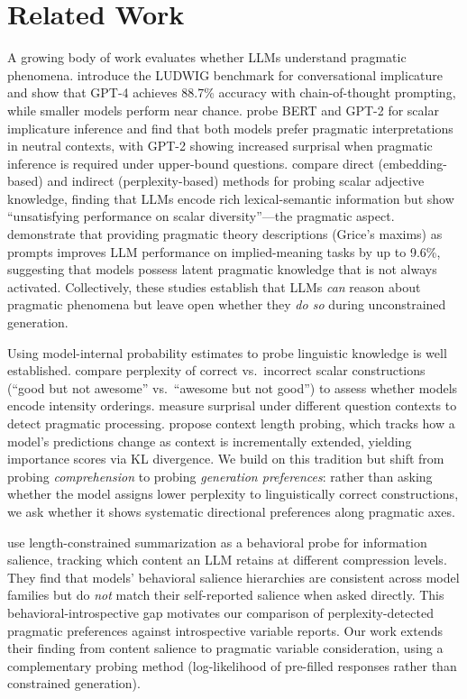 \section{Related Work}
\label{sec:related}

A growing body of work evaluates whether LLMs understand pragmatic phenomena. \citet{ruis2024goldilocks} introduce the LUDWIG benchmark for conversational implicature and show that GPT-4 achieves 88.7\% accuracy with chain-of-thought prompting, while smaller models perform near chance. \citet{cho2024pragmatic} probe BERT and GPT-2 for scalar implicature inference and find that both models prefer pragmatic interpretations in neutral contexts, with GPT-2 showing increased surprisal when pragmatic inference is required under upper-bound questions. \citet{lin2024probing} compare direct (embedding-based) and indirect (perplexity-based) methods for probing scalar adjective knowledge, finding that LLMs encode rich lexical-semantic information but show ``unsatisfying performance on scalar diversity''---the pragmatic aspect. \citet{sato2025pragmatic} demonstrate that providing pragmatic theory descriptions (\eg Grice's maxims) as prompts improves LLM performance on implied-meaning tasks by up to 9.6\%, suggesting that models possess latent pragmatic knowledge that is not always activated. Collectively, these studies establish that LLMs \emph{can} reason about pragmatic phenomena but leave open whether they \emph{do so} during unconstrained generation.

Using model-internal probability estimates to probe linguistic knowledge is well established. \citet{lin2024probing} compare perplexity of correct vs.\ incorrect scalar constructions (\eg ``good but not awesome'' vs.\ ``awesome but not good'') to assess whether models encode intensity orderings. \citet{cho2024pragmatic} measure surprisal under different question contexts to detect pragmatic processing. \citet{cifka2023blackbox} propose context length probing, which tracks how a model's predictions change as context is incrementally extended, yielding importance scores via KL divergence. We build on this tradition but shift from probing \emph{comprehension} to probing \emph{generation preferences}: rather than asking whether the model assigns lower perplexity to linguistically correct constructions, we ask whether it shows systematic directional preferences along pragmatic axes.

\citet{trienes2025behavioral} use length-constrained summarization as a behavioral probe for information salience, tracking which content an LLM retains at different compression levels. They find that models' behavioral salience hierarchies are consistent across model families but do \emph{not} match their self-reported salience when asked directly. This behavioral-introspective gap motivates our comparison of perplexity-detected pragmatic preferences against introspective variable reports. Our work extends their finding from content salience to pragmatic variable consideration, using a complementary probing method (log-likelihood of pre-filled responses rather than constrained generation).

